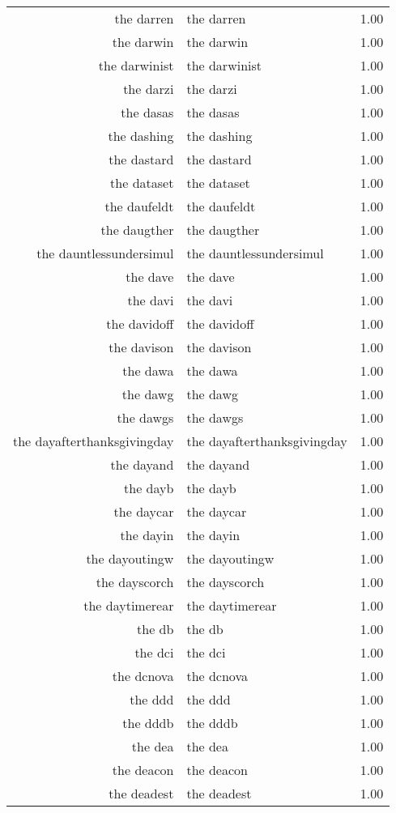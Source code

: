 \begin{table}[ht]
\begin{tabular}{rlr}
  the darren & the darren & 1.00 \\ 
  the darwin & the darwin & 1.00 \\ 
  the darwinist & the darwinist & 1.00 \\ 
  the darzi & the darzi & 1.00 \\ 
  the dasas & the dasas & 1.00 \\ 
  the dashing & the dashing & 1.00 \\ 
  the dastard & the dastard & 1.00 \\ 
  the dataset & the dataset & 1.00 \\ 
  the daufeldt & the daufeldt & 1.00 \\ 
  the daugther & the daugther & 1.00 \\ 
  the dauntlessundersimul & the dauntlessundersimul & 1.00 \\ 
  the dave & the dave & 1.00 \\ 
  the davi & the davi & 1.00 \\ 
  the davidoff & the davidoff & 1.00 \\ 
  the davison & the davison & 1.00 \\ 
  the dawa & the dawa & 1.00 \\ 
  the dawg & the dawg & 1.00 \\ 
  the dawgs & the dawgs & 1.00 \\ 
  the dayafterthanksgivingday & the dayafterthanksgivingday & 1.00 \\ 
  the dayand & the dayand & 1.00 \\ 
  the dayb & the dayb & 1.00 \\ 
  the daycar & the daycar & 1.00 \\ 
  the dayin & the dayin & 1.00 \\ 
  the dayoutingw & the dayoutingw & 1.00 \\ 
  the dayscorch & the dayscorch & 1.00 \\ 
  the daytimerear & the daytimerear & 1.00 \\ 
  the db & the db & 1.00 \\ 
  the dci & the dci & 1.00 \\ 
  the dcnova & the dcnova & 1.00 \\ 
  the ddd & the ddd & 1.00 \\ 
  the dddb & the dddb & 1.00 \\ 
  the dea & the dea & 1.00 \\ 
  the deacon & the deacon & 1.00 \\ 
  the deadest & the deadest & 1.00 \\ 

\end{tabular}
\end{table}
